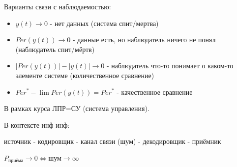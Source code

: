 \documentclass{article}
\begin{document}
\begin{sloppypar}
    Варианты связи с наблюдаемостью:
    \begin{itemize}
        \item $y(t) \rightarrow 0$ - нет данных (система спит/мертва)
        \item $Per(y(t)) \rightarrow 0$ - данные есть, но наблюдатель ничего
              не понял (наблюдатель спит/мёртв)
        \item $|Per(y(t))| - |y(t)| \rightarrow 0$ - наблюдатель что-то понимает о каком-то элементе системе (количественное сравнение)
        \item $Per^* - \lim Per(y(t)) = Per^*$ - качественное сравнение
    \end{itemize}

    В рамках курса ЛПР=СУ (система управления).

    В контексте инф-инф:

    источник - кодировщик - канал связи (шум) - декодировщик - приёмник

    $P_{\text{приёма}} \rightarrow 0 \Leftrightarrow \text{шум} \rightarrow \infty$



\end{sloppypar}
\end{document}
